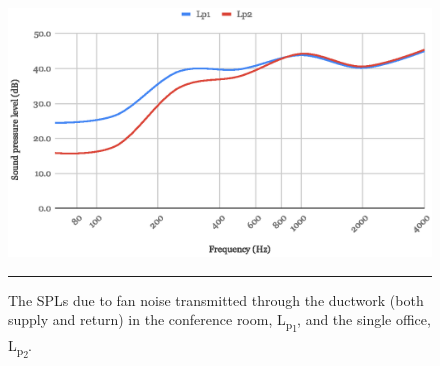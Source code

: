 \begin{figure}[H]
	\centering
	\includegraphics[width=\textwidth]{figures/Lp1+2.eps}
	\rule{\textwidth}{0.5pt} %
	\caption{The SPLs due to fan noise transmitted through the ductwork (both supply and return) in the conference room, L\textsubscript{p\textsubscript{1}}, and the single office, L\textsubscript{p\textsubscript{2}}.}
	\label{fig:Lp1+2}
\end{figure}